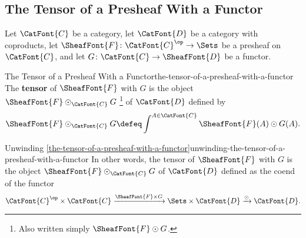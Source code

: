 \subsection{The Tensor of a Presheaf With a Functor}\label{subsection-the-tensor-of-a-presheaf-with-a-functor}
Let $\CatFont{C}$ be a category, let $\CatFont{D}$ be a category with coproducts, let $\SheafFont{F}\colon\CatFont{C}^{\op}\to\Sets$ be a presheaf on $\CatFont{C}$, and let $G\colon\CatFont{C}\to\SheafFont{D}$ be a functor.
\begin{definition}{The Tensor of a Presheaf With a Functor}{the-tensor-of-a-presheaf-with-a-functor}%
    The \textbf{tensor} of $\SheafFont{F}$ with $G$ is the object $\SheafFont{F}\odot_{\CatFont{C}}G$%
    \footnote{%
        Also written simply $\SheafFont{F}\odot G$.
        \par\vspace*{-1.75\baselineskip}
    } %
    of $\CatFont{D}$ defined by
    \[
        \SheafFont{F}\odot_{\CatFont{C}}G%
        \defeq%
        \int^{A\in\CatFont{C}}\SheafFont{F}(A)\odot G(A).%
    \]%
\end{definition}
\begin{remark}{Unwinding \cref{the-tensor-of-a-presheaf-with-a-functor}}{unwinding-the-tensor-of-a-presheaf-with-a-functor}%
    In other words, the tensor of $\SheafFont{F}$ with $G$ is the object $\SheafFont{F}\odot_{\CatFont{C}}G$ of $\CatFont{D}$ defined as the coend of the functor
    \[
        \CatFont{C}^{\op}\times\CatFont{C}%
        \xrightarrow{\SheafFont{F}\times G}%
        \Sets\times\CatFont{D}%
        \xrightarrow{\odot}%
        \CatFont{D}.%
    \]%
\end{remark}
